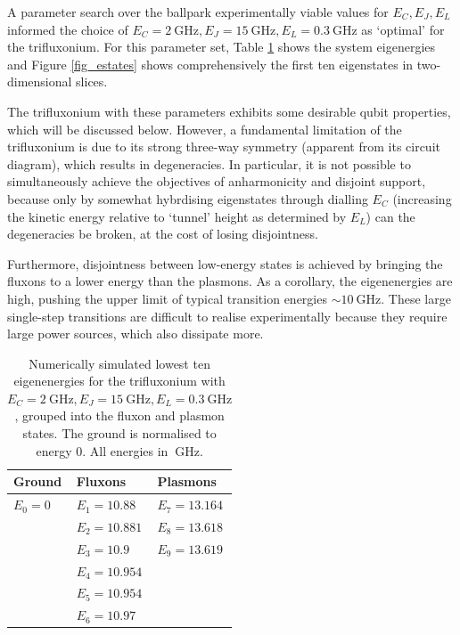 \documentclass[11pt]{article}
\begin{document}
A parameter search over the ballpark experimentally viable values for $E_C, E_J, E_L$ informed the choice of $E_C = \SI{2}{\giga\hertz}, E_J = \SI{15}{\giga\hertz}, E_L = \SI{0.3}{\giga\hertz}$ as `optimal' for the trifluxonium. For this parameter set, Table \ref{tab_eigenenergies} shows the system eigenergies and Figure \ref{fig_estates} shows comprehensively the first ten eigenstates in two-dimensional slices. 

The trifluxonium with these parameters exhibits some desirable qubit properties, which will be discussed below. However, a fundamental limitation of the trifluxonium is due to its strong three-way symmetry (apparent from its circuit diagram), which results in degeneracies. In particular, it is not possible to simultaneously achieve the objectives of anharmonicity and disjoint support, because only by somewhat hybrdising eigenstates through dialling $E_C$ (increasing the kinetic energy relative to `tunnel' height as determined by $E_L$) can the degeneracies be broken, at the cost of losing disjointness. 

Furthermore, disjointness between low-energy states is achieved by bringing the fluxons to a lower energy than the plasmons. As a corollary, the eigenenergies are high, pushing the upper limit of typical transition energies $\sim \SI{10}{\giga\hertz}$. These large single-step transitions are difficult to realise experimentally because they require large power sources, which also dissipate more.

\begin{table}[H]
	\centering
	\begin{tabular}{l l l}
		\hline
		Ground 		& Fluxons 			& Plasmons \\
		\hline
		$E_0 = 0$ 	& $E_1 = 10.88$		& $E_7 = 13.164$ \\
					& $E_2 = 10.881$ 	& $E_8 = 13.618$ \\
					& $E_3 = 10.9$		& $E_9 = 13.619$ \\
					& $E_4 = 10.954$ 	& \\
					& $E_5 = 10.954$ 	& \\
					& $E_6 = 10.97$		& \\
		\hline
	\end{tabular}
	\caption{Numerically simulated lowest ten eigenenergies for the trifluxonium with $E_C = \SI{2}{\giga\hertz}, E_J = \SI{15}{\giga\hertz}, E_L = \SI{0.3}{\giga\hertz}$, grouped into the fluxon and plasmon states. The ground is normalised to energy 0. All energies in $\SI{}{\giga\hertz}$.}
	\label{tab_eigenenergies}
\end{table}
\end{document}
